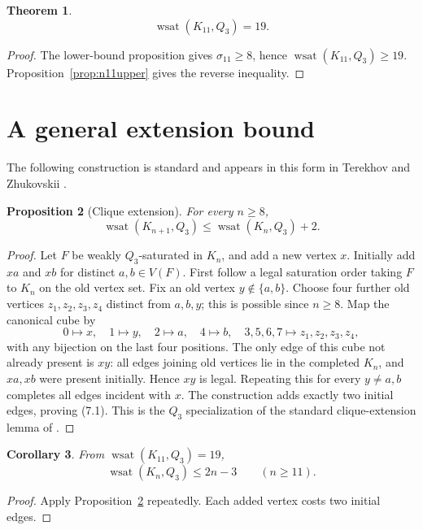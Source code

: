 \documentclass[11pt]{article}
\numberwithin{equation}{section}
\newtheorem{theorem}{Theorem}[section]
\newtheorem{proposition}[theorem]{Proposition}
\newtheorem{corollary}[theorem]{Corollary}
\newcommand{\wsat}{\operatorname{wsat}}
\begin{document}
\begin{theorem}\label{thm:n11}
\[
\boxed{\wsat(K_{11},Q_3)=19.}
\]
\end{theorem}

\begin{proof}
The lower-bound proposition gives $\sigma_{11}\ge8$, hence $\wsat(K_{11},Q_3)\ge19$. Proposition~\ref{prop:n11upper} gives the reverse inequality.
\end{proof}

\section{A general extension bound}\label{sec:extension}
The following construction is standard and appears in this form in Terekhov and Zhukovskii \cite{TZ2025}.

\begin{proposition}[Clique extension]\label{prop:extension}
For every $n\ge8$,
\[
\wsat(K_{n+1},Q_3)\le \wsat(K_n,Q_3)+2.
\tag{7.1}
\]
\end{proposition}

\begin{proof}
Let $F$ be weakly $Q_3$-saturated in $K_n$, and add a new vertex $x$. Initially add $xa$ and $xb$ for distinct $a,b\in V(F)$. First follow a legal saturation order taking $F$ to $K_n$ on the old vertex set. Fix an old vertex $y\notin\{a,b\}$. Choose four further old vertices $z_1,z_2,z_3,z_4$ distinct from $a,b,y$; this is possible since $n\ge8$. Map the canonical cube by
\[
0\mapsto x,\quad 1\mapsto y,\quad 2\mapsto a,\quad 4\mapsto b,\quad 3,5,6,7\mapsto z_1,z_2,z_3,z_4,
\]
with any bijection on the last four positions. The only edge of this cube not already present is $xy$: all edges joining old vertices lie in the completed $K_n$, and $xa,xb$ were present initially. Hence $xy$ is legal. Repeating this for every $y\ne a,b$ completes all edges incident with $x$. The construction adds exactly two initial edges, proving (7.1). This is the $Q_3$ specialization of the standard clique-extension lemma of \cite{TZ2025}.
\end{proof}

\begin{corollary}\label{cor:family}
From $\wsat(K_{11},Q_3)=19$,
\[
\boxed{\wsat(K_n,Q_3)\le2n-3\qquad(n\ge11).}
\tag{7.2}
\]
\end{corollary}

\begin{proof}
Apply Proposition~\ref{prop:extension} repeatedly. Each added vertex costs two initial edges.
\end{proof}
\end{document}
